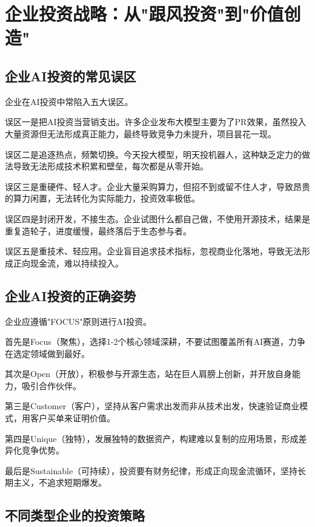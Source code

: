 \section{企业投资战略：从"跟风投资"到"价值创造"}

\subsection{企业AI投资的常见误区}

企业在AI投资中常陷入五大误区。

误区一是把AI投资当营销支出。许多企业发布大模型主要为了PR效果，虽然投入大量资源但无法形成真正能力，最终导致竞争力未提升，项目昙花一现。

误区二是追逐热点，频繁切换。今天投大模型，明天投机器人，这种缺乏定力的做法导致无法形成技术积累和壁垒，每次都是从零开始。

误区三是重硬件、轻人才。企业大量采购算力，但招不到或留不住人才，导致昂贵的算力闲置，无法转化为实际能力，投资效率极低。

误区四是封闭开发，不接生态。企业试图什么都自己做，不使用开源技术，结果是重复造轮子，进度缓慢，最终落后于生态参与者。

误区五是重技术、轻应用。企业盲目追求技术指标，忽视商业化落地，导致无法形成正向现金流，难以持续投入。

\subsection{企业AI投资的正确姿势}

企业应遵循"FOCUS"原则进行AI投资。

首先是Focus（聚焦），选择1-2个核心领域深耕，不要试图覆盖所有AI赛道，力争在选定领域做到最好。

其次是Open（开放），积极参与开源生态，站在巨人肩膀上创新，并开放自身能力，吸引合作伙伴。

第三是Customer（客户），坚持从客户需求出发而非从技术出发，快速验证商业模式，用客户买单来证明价值。

第四是Unique（独特），发展独特的数据资产，构建难以复制的应用场景，形成差异化竞争优势。

最后是Sustainable（可持续），投资要有财务纪律，形成正向现金流循环，坚持长期主义，不追求短期爆发。

\subsection{不同类型企业的投资策略}

